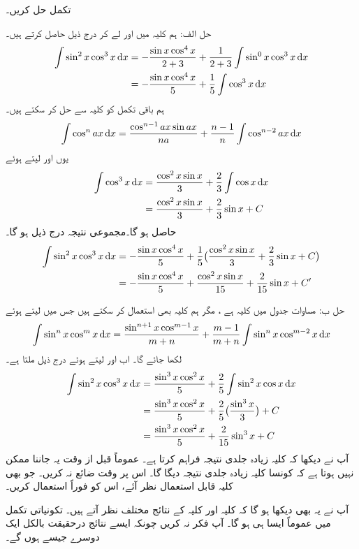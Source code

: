 تکمل  حل کریں۔

حل الف:\quad
ہم کلیہ  میں  اور  لے کر درج ذیل حاصل کرتے ہیں۔
\begin{align*}
\int \sin^2x\cos^3x\dif x&=-\frac{\sin x\cos^4x}{2+3}+\frac{1}{2+3}\int\sin^0x\cos^3x\dif x\\
&=-\frac{\sin x\cos^4x}{5}+\frac{1}{5}\int\cos^3x\dif x
\end{align*}
ہم باقی تکمل کو کلیہ  سے حل کر سکتے ہیں۔
\begin{align*}
\int\cos^nax\dif x=\frac{\cos^{n-1}ax\sin ax}{na}+\frac{n-1}{n}\int\cos^{n-2}ax\dif x
\end{align*}
یوں  اور  لیتے ہوئے
 \begin{align*}
\int\cos^3x\dif x&=\frac{\cos^2x\sin x}{3}+\frac{2}{3}\int\cos x\dif x\\
&=\frac{\cos^2x\sin x}{3}+\frac{2}{3}\sin x+C
\end{align*}
حاصل ہو گا۔مجموعی نتیجہ درج ذیل ہو گا۔
\begin{align*}
\int\sin^2x\cos^3x\dif x &=-\frac{\sin x\cos^4x}{5}+\frac{1}{5}\big(\frac{\cos^2x\sin x}{3}+\frac{2}{3}\sin x+C\big)\\
&=-\frac{\sin x\cos^4 x}{5}+\frac{\cos^2x\sin x}{15}+\frac{2}{15}\sin x+C'
\end{align*}

حل ب:\quad
مساوات  جدول میں کلیہ  ہے ، مگر ہم کلیہ  بھی استعمال کر سکتے ہیں جس میں  لیتے ہوئے
\begin{align*}
\int \sin^nx\cos^mx\dif x=\frac{\sin^{n+1}x\cos^{m-1}x}{m+n}+\frac{m-1}{m+n}\int \sin^nx\cos^{m-2}x\dif x
\end{align*}
لکھا جائے گا۔ اب  اور  لیتے ہوئے درج ذیل ملتا ہے۔
\begin{align*}
\int\sin^2x\cos^3x\dif x&=\frac{\sin^3x\cos^2x}{5}+\frac{2}{5}\int\sin^2x\cos x\dif x\\
&=\frac{\sin^3x\cos^2x}{5}+\frac{2}{5}\big(\frac{\sin^3x}{3}\big)+C\\
&=\frac{\sin^3x\cos^2x}{5}+\frac{2}{15}\sin^3x+C
\end{align*} 
آپ نے دیکھا کہ کلیہ  زیادہ جلدی نتیجہ فراہم کرتا ہے۔ عموماً قبل از وقت یہ جاننا ممکن نہیں ہوتا ہے کہ کونسا کلیہ زیادہ جلدی نتیجہ دیگا گا۔ اس پر وقت ضائع نہ کریں۔ جو بھی کلیہ قابل استعمال نظر آئے، اس کو فوراً استعمال کریں۔

آپ نے یہ بھی دیکھا ہو گا کہ کلیہ  اور کلیہ  کے نتائج مختلف نظر آتے ہیں۔ تکونیاتی تکمل میں عموماً ایسا ہی ہو گا۔ آپ فکر نہ کریں چونکہ ایسے نتائج درحقیقت بالکل ایک دوسرے جیسے ہوں گے۔


